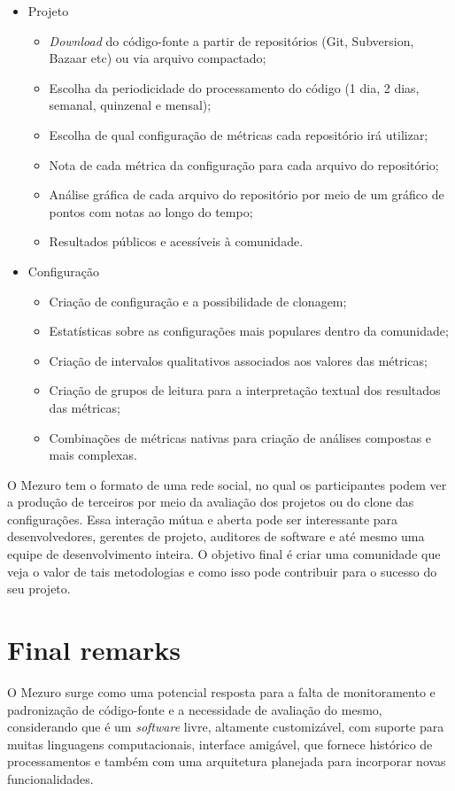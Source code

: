 \documentclass{llncs}
\begin{document}
\begin{itemize}
  \item Projeto
    \begin{itemize}
    \item \textit{Download} do código-fonte a partir de repositórios (Git, Subversion, Bazaar etc) ou via arquivo compactado;
        \item Escolha da periodicidade do processamento do código (1 dia, 2 dias, semanal, quinzenal e mensal);
        \item Escolha de qual configuração de métricas cada repositório irá utilizar;
        \item Nota de cada métrica da configuração para cada arquivo do repositório;
        \item Análise gráfica de cada arquivo do repositório por meio de um gráfico de pontos com notas ao longo do tempo;
        \item Resultados públicos e acessíveis à comunidade.
    \end{itemize}
    \item Configuração
    \begin{itemize}
    \item Criação de configuração e a possibilidade de clonagem;
        \item Estatísticas sobre as configurações mais populares dentro da comunidade;
        \item Criação de intervalos qualitativos associados aos valores das métricas;
        \item Criação de grupos de leitura para a interpretação textual dos resultados das métricas;
        \item Combinações de métricas nativas para criação de análises compostas e mais complexas.
    \end{itemize}
\end{itemize}

O Mezuro tem o formato de uma rede social, no qual os participantes podem ver a
produção de terceiros por meio da avaliação dos projetos ou do clone das
configurações. Essa interação mútua e aberta pode ser interessante para
desenvolvedores, gerentes de projeto, auditores de software e até
mesmo uma equipe de desenvolvimento inteira. O objetivo final é criar uma
comunidade que veja o valor de tais metodologias e como isso pode contribuir
para o sucesso do seu projeto.

\section{Final remarks}

O Mezuro surge como uma potencial resposta para a falta de monitoramento e
padronização de código-fonte e a necessidade de avaliação do mesmo,
considerando que é um \textit{software} livre, altamente customizável, com
suporte para muitas linguagens computacionais, interface amigável, que fornece
histórico de processamentos e também com uma arquitetura planejada para
incorporar novas funcionalidades.




\end{document}

